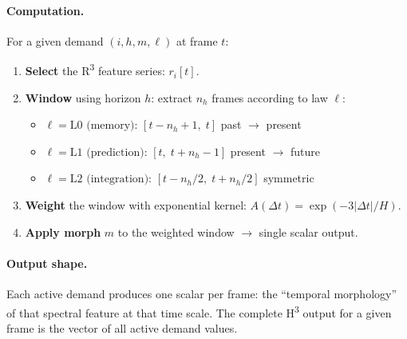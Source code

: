 \paragraph{Computation.}
For a given demand $(i, h, m, \ell)$ at frame $t$:

\begin{enumerate}\itemsep2pt
  \item \textbf{Select} the R\textsuperscript{3} feature series: $r_i[t]$.
  \item \textbf{Window} using horizon $h$: extract $n_h$ frames
        according to law $\ell$:
        \begin{itemize}\itemsep1pt
          \item $\ell = \text{L0 (memory)}$: $[t - n_h + 1,\; t]$ \hfill past $\to$ present
          \item $\ell = \text{L1 (prediction)}$: $[t,\; t + n_h - 1]$ \hfill present $\to$ future
          \item $\ell = \text{L2 (integration)}$: $[t - n_h/2,\; t + n_h/2]$ \hfill symmetric
        \end{itemize}
  \item \textbf{Weight} the window with exponential kernel:
        $A(\Delta t) = \exp(-3|\Delta t|/H)$.
  \item \textbf{Apply morph} $m$ to the weighted window
        $\to$ single scalar output.
\end{enumerate}

\paragraph{Output shape.}
Each active demand produces one scalar per frame: the
``temporal morphology'' of that spectral feature at that time scale.
The complete H\textsuperscript{3} output for a given frame is the vector
of all active demand values.

\medskip

